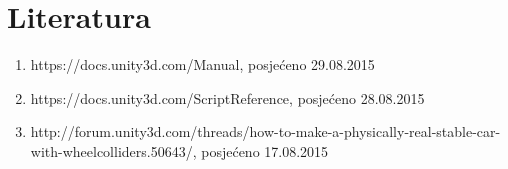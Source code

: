 \section{Literatura}
\begin{enumerate}
	\item https://docs.unity3d.com/Manual, posjećeno 29.08.2015
	\item https://docs.unity3d.com/ScriptReference, posjećeno 28.08.2015
	\item http://forum.unity3d.com/threads/how-to-make-a-physically-real-stable-car-with-wheelcolliders.50643/, posjećeno 17.08.2015
\end{enumerate}